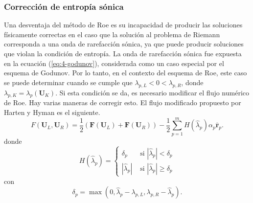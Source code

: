 \subsubsection{Corrección de entropía sónica}
Una desventaja del método de Roe es su incapacidad de producir las soluciones físicamente correctas en el caso que la solución al problema de Riemann corresponda a una onda de rarefacción sónica, ya que puede producir soluciones que violan la condición de entropía. La onda de rarefacción sónica fue expuesta en la ecuación (\ref{eq:4-godunov}), considerada como un caso especial por el esquema de Godunov. Por lo tanto, en el contexto del esquema de Roe, este caso se puede determinar cuando se cumple que $\lambda_{p,L} < 0 < \lambda_{p,R}$, donde $\lambda_{p,K} = \lambda_{p}(\mathbf{{U}}_K)$. Si esta condición se da, es necesario modificar el flujo numérico de Roe. Hay varias maneras de corregir esto. El flujo modificado propuesto por Harten y Hyman
\cite{pelanti}
 es el siguiente.
\begin{equation}
	F(\mathbf{U}_L, \mathbf{U}_R) = \frac{1}{2}\left(\mathbf{F}(\mathbf{U}_L) +\mathbf{F}(\mathbf{U}_R)\right) - 
	\frac{1}{2}\sum_{p=1}^{m}H(\hat{\lambda}_{p})\alpha_{p}\mathbf{\hat{r}}_{p}.
	\label{eq:flux-HH-fix}
\end{equation}
donde
\begin{equation}
	H(\hat{\lambda}_{p})=
	\begin{cases}
		\delta_{p} & \text{ si } |\hat{\lambda}_p| < \delta_{p}\\
		|\hat{\lambda}_p| & \text{ si } |\hat{\lambda}_p| \geq \delta_{p}
	\end{cases}
\end{equation}
con
\begin{equation}
	\delta_{p} = \max(0, \hat{\lambda}_p - \lambda_{p,L}, \lambda_{p,R}- \hat{\lambda}_p).
\end{equation}
